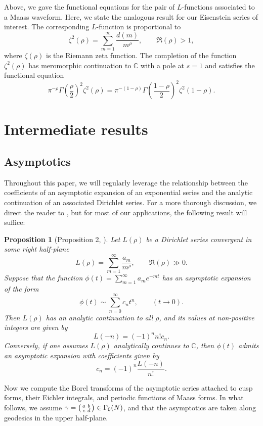 \documentclass[12pt]{amsart}
\theoremstyle{definition}
\theoremstyle{plain}
\newtheorem{prop}[theorem]{Proposition}
\numberwithin{equation}{section}
\begin{document}
Above, we gave the functional equations for the pair of $L$-functions associated to a Maass waveform. Here, we state the analogous result for our Eisenstein series of interest. 
The corresponding $L$-function is proportional to
\[\zeta^2(\rho) = \sum_{m=1}^\infty \frac{d(m)}{m^\rho}, \quad \quad \Re(\rho)>1,
\]
where $\zeta(\rho)$ is the Riemann zeta function. The completion of the function $\zeta^2(\rho)$ has meromorphic continuation to $\mathbb{C}$ with a pole at $s=1$ and satisfies the functional equation 
\[\pi^{-\rho} \Gamma\left(\frac{\rho}{2}\right)^2 \zeta^2(\rho) = \pi^{-(1-\rho)} \Gamma\left(\frac{1-\rho}{2}\right)^2 \zeta ^2(1-\rho).
\]

\section{Intermediate results}\label{sec: intermediate}

\subsection{Asymptotics} \label{subsec: asymptotics}

Throughout this paper, we will regularly leverage the relationship between the coefficients of an asymptotic expansion of an exponential series and the analytic continuation of an associated Dirichlet series. For a more thorough discussion, we direct the reader to \cite{zagier-appendix}, but for most of our applications, the following result will suffice:
\begin{prop}[Proposition 2, \cite{zagier-appendix}]
Let $L(\rho)$ be a Dirichlet series convergent in some right half-plane
\[L(\rho) = \sum_{m=1}^\infty \frac{a_m}{m^\rho}, \quad \quad \Re(\rho) \gg 0.
\]
Suppose that the function $\phi(t) = \sum_{m=1}^\infty a_me^{-mt}$ has an asymptotic expansion of the form 
\[\phi(t) \sim \sum_{n=0}^\infty c_n t^n, \quad \quad (t \to 0).
\]
Then $L(\rho)$ has an analytic continuation to all $\rho$, and its values at non-positive integers are given by
\[ L(-n) = (-1)^n n! c_n.
\]
Conversely, if one assumes $L(\rho)$ analytically continues to $\mathbb{C}$, then $\phi(t)$ admits an asymptotic expansion with coefficients given by 
\[c_n  = (-1)^n \frac{L(-n)}{n!}.
\]
\end{prop}

Now we compute the Borel transforms of the asymptotic series attached to cusp forms, their Eichler integrals, and periodic functions of Maass forms. In what follows, we assume $\gamma = \begin{psmallmatrix} a & b \\ c & d\end{psmallmatrix} \in \Gamma_0(N)$, and that the asymptotics are taken along geodesics in the upper half-plane. 
\end{document}
